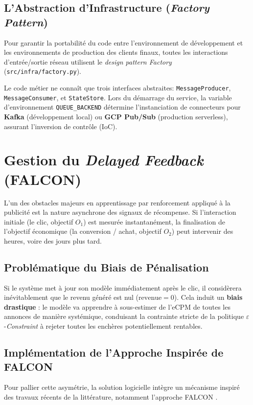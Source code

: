 \subsection{L'Abstraction d'Infrastructure (\textit{Factory Pattern})}

Pour garantir la portabilité du code entre l'environnement de développement et les environnements de production des clients finaux, toutes les interactions d'entrée/sortie réseau utilisent le \textit{design pattern Factory} (\texttt{src/infra/factory.py}).

Le code métier ne connaît que trois interfaces abstraites: \texttt{MessageProducer}, \texttt{MessageConsumer}, et \texttt{StateStore}. Lors du démarrage du service, la variable d'environnement \texttt{QUEUE\_BACKEND} détermine l'instanciation de connecteurs pour \textbf{Kafka} (développement local) ou \textbf{GCP Pub/Sub} (production serverless), assurant l'inversion de contrôle (IoC).


\section{Gestion du \textit{Delayed Feedback} (FALCON)}
\label{sec:delayed_feedback}

L'un des obstacles majeurs en apprentissage par renforcement appliqué à la publicité est la nature asynchrone des signaux de récompense. Si l'interaction initiale (le clic, objectif $O_1$) est mesurée instantanément, la finalisation de l'objectif économique (la conversion / achat, objectif $O_2$) peut intervenir des heures, voire des jours plus tard.

\subsection{Problématique du Biais de Pénalisation}
Si le système met à jour son modèle immédiatement après le clic, il considèrera inévitablement que le revenu généré est nul ($\text{revenue} = 0$). Cela induit un \textbf{biais drastique} : le modèle va apprendre à sous-estimer de l'eCPM de toutes les annonces de manière systémique, conduisant la contrainte stricte de la politique $\varepsilon$-\textit{Constraint} à rejeter toutes les enchères potentiellement rentables.

\subsection{Implémentation de l'Approche Inspirée de FALCON}
Pour pallier cette asymétrie, la solution logicielle intègre un mécanisme inspiré des travaux récents de la littérature, notamment l'approche FALCON \parencite{ktena2019addressing}.

